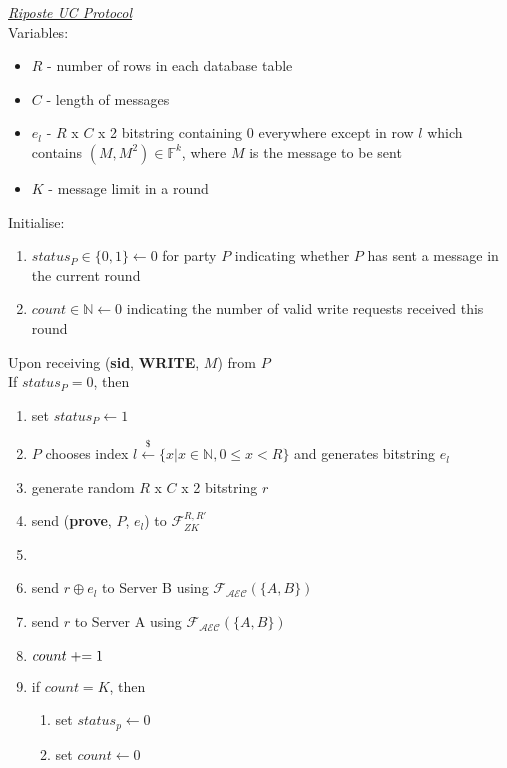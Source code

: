 \begin{tcolorbox}[colback=white, arc=5pt]
\noindent\emph{\underline{Riposte UC Protocol}}\\[5pt]
Variables:
\begin{itemize}
    \item $R$ - number of rows in each database table
    \item $C$ - length of messages
    \item $e_l$ - $R$ x $C$ x 2 bitstring containing 0 everywhere except in row $l$ which contains $(M, M^2)\in \mathbb{F}^k$, where $M$ is the message to be sent
    \item $K$ - message limit in a round
\end{itemize}
 Initialise:
 \begin{enumerate}
     \item $status_P\in\{0,1\}\leftarrow 0$ for party $P$ indicating whether $P$ has sent a message in the current round
     \item $count\in\mathbb{N}\leftarrow 0$ indicating the number of valid write requests received this round
 \end{enumerate}
 
 
\extitem Upon receiving (\textbf{sid}, \textbf{WRITE}, $M$) from $P$\\
If $status_P=0$, then
\begin{enumerate}
    \item set $status_P\leftarrow 1$
    \item $P$ chooses index $l \overset{{\scriptscriptstyle\$}}{\leftarrow} \{x | x \in \mathbb{N}, 0 \le x < R\}$ and generates bitstring $e_l$
    \item generate random $R$ x $C$ x 2 bitstring $r$
    \item send (\textbf{prove}, $P$, $e_l$) to $\mathcal{F}_{ZK}^{R,R'}$
    \item 
    \item send $r\oplus e_l$ to Server B using $\mathcal{F}_{\mathcal{AEC}}(\{A,B\})$
    \item send $r$ to Server A using $\mathcal{F}_{\mathcal{AEC}}(\{A,B\})$
    
    \item $count \mathrel{+}= 1$
    \item if $count=K$, then
    \begin{enumerate}
        \item set $status_p\leftarrow0$
        \item set $count \leftarrow 0$
    \end{enumerate}
\end{enumerate}


\end{tcolorbox}

